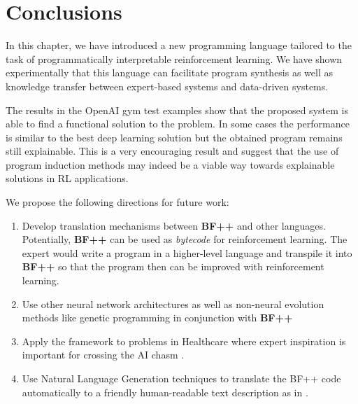 \newpage
\section{Conclusions}

In this chapter, we have introduced a new programming language tailored to the task of programmatically interpretable reinforcement learning.
We have shown experimentally that this language can facilitate program synthesis as well as knowledge transfer between expert-based systems and data-driven systems. 

The results in the OpenAI gym test examples show that the proposed system is able to find a functional solution to the problem. In some cases the performance is similar to the best deep learning solution but the obtained program remains still explainable. This is a very encouraging result and suggest that the use of program induction methods may indeed be a viable way towards explainable solutions in RL applications. 

We propose the following directions for future work:
\begin{enumerate}
    \item Develop translation mechanisms between \textbf{BF++} and other languages. Potentially, \textbf{BF++} can be used as \emph{bytecode} \cite{bytecode} for reinforcement learning. The expert would write a program in a higher-level language and transpile it into \textbf{BF++} so that the program then can be improved with reinforcement learning.
    \item Use other neural network architectures as well as non-neural evolution methods like genetic programming \cite{genprog1,genprog2} in conjunction with \textbf{BF++}
    \item Apply the framework to problems in Healthcare where expert inspiration is important for crossing the AI chasm \cite{aichasm}.    \item Use Natural Language Generation techniques to translate the BF++ code automatically to a friendly human-readable text description as in \cite{code2nlg1,code2nlg2}.
\end{enumerate}